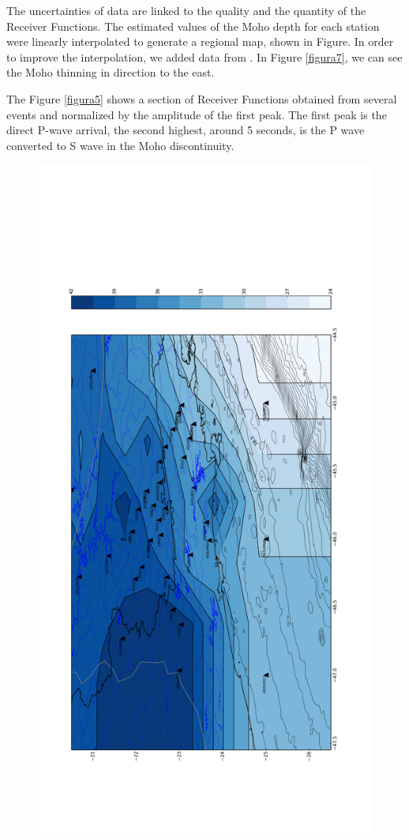The uncertainties of data are linked to the quality and the quantity of the Receiver Functions. The estimated values of the Moho depth for each station were linearly interpolated to generate a regional map, shown in Figure. In order to improve the interpolation, we added data from \citep{assumpcao_crustal_2013}. In Figure \ref{figura7}, we can see the Moho thinning in direction to the east.

The Figure \ref{figura5} shows a section of Receiver Functions obtained from several events and normalized by the amplitude of the first peak. The first peak is the direct P-wave arrival, the second highest, around 5 seconds, is the P wave converted to S wave in the Moho discontinuity. 


\begin{figure}[!ht]
\centering
\includegraphics[scale=0.2]{Interpolacao_Linear.png}
\caption{}
\label{RF_perfil_NW}
\end{figure}

